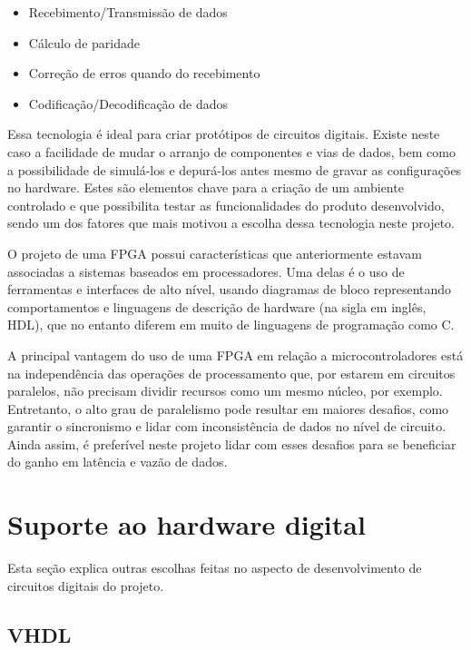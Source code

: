 	\begin{itemize}
		\item Recebimento/Transmissão de dados
		\item Cálculo de paridade
		\item Correção de erros quando do recebimento
		\item Codificação/Decodificação de dados
	\end{itemize}

	Essa tecnologia é ideal para criar protótipos de circuitos digitais. Existe neste caso a facilidade de mudar o arranjo de componentes e vias de dados, bem como a possibilidade de simulá-los e depurá-los antes mesmo de gravar as configurações no hardware. Estes são elementos chave para a criação de um ambiente controlado e que possibilita testar as funcionalidades do produto desenvolvido, sendo um dos fatores que mais motivou a escolha dessa tecnologia neste projeto.

	O projeto de uma FPGA possui características que anteriormente estavam associadas a sistemas baseados em processadores. Uma delas é o uso de ferramentas e interfaces de alto nível, usando diagramas de bloco representando comportamentos e linguagens de descrição de hardware (na sigla em inglês, HDL), que no entanto diferem em muito de linguagens de programação como C.

	A principal vantagem do uso de uma FPGA em relação a microcontroladores está na independência das operações de processamento que, por estarem em circuitos paralelos, não precisam dividir recursos como um mesmo núcleo, por exemplo. Entretanto, o alto grau de paralelismo pode resultar em maiores desafios, como garantir o sincronismo e lidar com inconsistência de dados no nível de circuito. Ainda assim, é preferível neste projeto lidar com esses desafios para se beneficiar do ganho em latência e vazão de dados.

	\section{Suporte ao hardware digital}\label{sec-software}

	Esta seção explica outras escolhas feitas no aspecto de desenvolvimento de circuitos digitais do projeto.

	\subsection{VHDL}\label{soft-vhdl}

